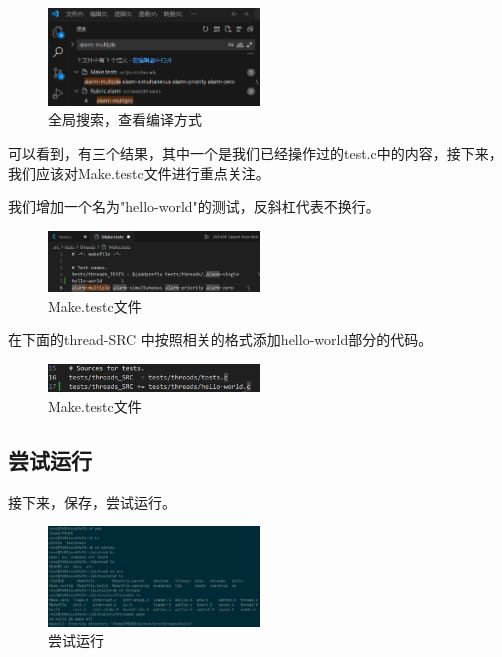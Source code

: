 \begin{figure}[H]
  \centering
  \includegraphics[width=0.5\textwidth]{img2/3.png}
  \caption{全局搜索，查看编译方式}
\end{figure}

可以看到，有三个结果，其中一个是我们已经操作过的test.c中的内容，接下来，我们应该对Make.testc文件进行重点关注。

我们增加一个名为"hello-world"的测试，反斜杠代表不换行。

\begin{figure}[H]
  \centering
  \includegraphics[width=0.5\textwidth]{img2/4.png}
  \caption{Make.testc文件}
\end{figure}

在下面的thread-SRC 中按照相关的格式添加hello-world部分的代码。

\begin{figure}[H]
  \centering
  \includegraphics[width=0.5\textwidth]{img2/5.png}
  \caption{Make.testc文件}
\end{figure}

\subsection{尝试运行}

接下来，保存，尝试运行。

\begin{figure}[H]
  \centering
  \includegraphics[width=0.5\textwidth]{img2/6.png}
  \caption{尝试运行}
\end{figure}

